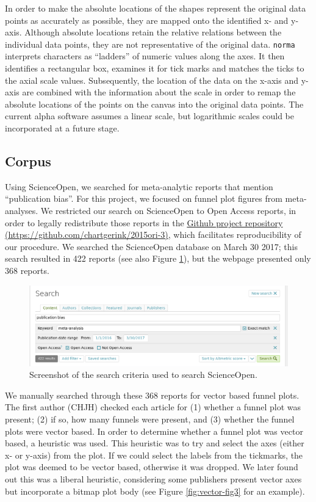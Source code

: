 \documentclass[a5paper]{book}
\begin{document}
In order to make the absolute locations of the shapes represent the
original data points as accurately as possible, they are mapped onto the
identified x- and y-axis. Although absolute locations retain the
relative relations between the individual data points, they are not
representative of the original data. \texttt{norma} interprets
characters as \enquote{ladders} of numeric values along the axes. It
then identifies a rectangular box, examines it for tick marks and
matches the ticks to the axial scale values. Subsequently, the location
of the data on the x-axis and y-axis are combined with the information
about the scale in order to remap the absolute locations of the points
on the canvas into the original data points. The current alpha software
assumes a linear scale, but logarithmic scales could be incorporated at
a future stage.

\subsection{Corpus}\label{corpus}

Using ScienceOpen, we searched for meta-analytic reports that mention
\enquote{publication bias}. For this project, we focused on funnel plot
figures from meta-analyses. We restricted our search on ScienceOpen to
Open Access reports, in order to legally redistribute those reports in
the \href{https://github.com/chartgerink/2015ori-3}{Github project
repository (https://github.com/chartgerink/2015ori-3)}, which
facilitates reproducibility of our procedure. We searched the
ScienceOpen database on March 30 2017; this search resulted in 422
reports (see also Figure \ref{fig:vector-fig2}), but the webpage
presented only 368 reports.

\begin{figure}
\includegraphics[width=1\linewidth]{assets/figures/search-results} \caption{Screenshot of the search criteria used to search ScienceOpen.}\label{fig:vector-fig2}
\end{figure}

We manually searched through these 368 reports for vector based funnel
plots. The first author (CHJH) checked each article for (1) whether a
funnel plot was present; (2) if so, how many funnels were present, and
(3) whether the funnel plots were vector based. In order to determine
whether a funnel plot was vector based, a heuristic was used. This
heuristic was to try and select the axes (either x- or y-axis) from the
plot. If we could select the labels from the tickmarks, the plot was
deemed to be vector based, otherwise it was dropped. We later found out
this was a liberal heuristic, considering some publishers present vector
axes but incorporate a bitmap plot body (see Figure
\ref{fig:vector-fig3} for an example).
\end{document}
